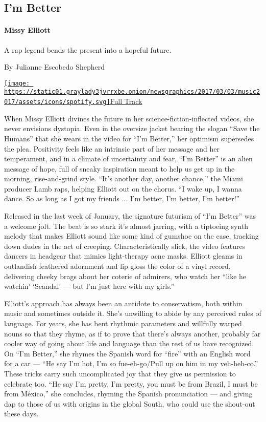 \hypertarget{--im-better}{%
\subsection{\texorpdfstring{ I'm
Better}{  I'm Better}}\label{--im-better}}

\hypertarget{missy-elliott}{%
\paragraph{Missy Elliott}\label{missy-elliott}}

A rap legend bends the present into a hopeful future.

By Julianne Escobedo Shepherd

\href{https://open.spotify.com/track/2Kf9fwIOwZwd6Aw7OxfkF0}{\texttt{[image: https://static01.graylady3jvrrxbe.onion/newsgraphics/2017/03/03/music2017/assets/icons/spotify.svg]}Full
Track}

When Missy Elliott divines the future in her science-fiction-inflected
videos, she never envisions dystopia. Even in the oversize jacket
bearing the slogan ``Save the Humans'' that she wears in the video for
``I'm Better,'' her optimism supersedes the plea. Positivity feels like
an intrinsic part of her message and her temperament, and in a climate
of uncertainty and fear, ``I'm Better'' is an alien message of hope,
full of sneaky inspiration meant to help us get up in the morning,
rise-and-grind style. ``It's another day, another chance,'' the Miami
producer Lamb raps, helping Elliott out on the chorus. ``I wake up, I
wanna dance. So as long as I got my friends ... I'm better, I'm better,
I'm better!''

Released in the last week of January, the signature futurism of ``I'm
Better'' was a welcome jolt. The beat is so stark it's almost jarring,
with a tiptoeing synth melody that makes Elliott sound like some kind of
gumshoe on the case, tracking down dudes in the act of creeping.
Characteristically slick, the video features dancers in headgear that
mimics light-therapy acne masks. Elliott gleams in outlandish feathered
adornment and lip gloss the color of a vinyl record, delivering cheeky
brags about her coterie of admirers, who watch her ``like he watchin'
`Scandal' --- but I'm just here with my girls.''

Elliott's approach has always been an antidote to conservatism, both
within music and sometimes outside it. She's unwilling to abide by any
perceived rules of language. For years, she has bent rhythmic parameters
and willfully warped nouns so that they rhyme, as if to prove that
there's always another, probably far cooler way of going about life and
language than the rest of us have recognized. On ``I'm Better,'' she
rhymes the Spanish word for ``fire'' with an English word for a car ---
``He say I'm hot, I'm so fue-eh-go/Pull up on him in my veh-heh-co.''
These tricks carry such uncomplicated joy that they give us permission
to celebrate too. ``He say I'm pretty, I'm pretty, you must be from
Brazil, I must be from México,'' she concludes, rhyming the Spanish
pronunciation --- and giving dap to those of us with origins in the
global South, who could use the shout-out these days.

